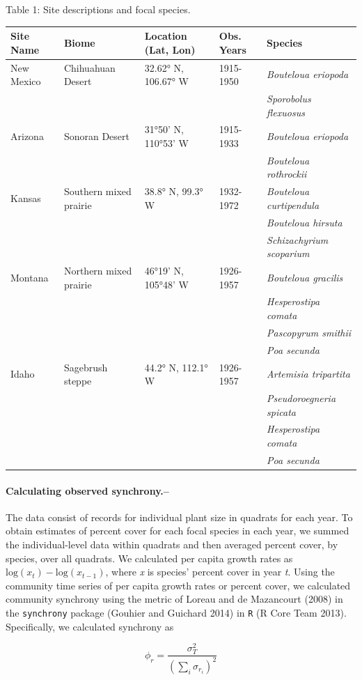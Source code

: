 \documentclass[12pt,]{article}
\begin{document}
\vspace{2em}

Table 1: Site descriptions and focal species. \footnotesize
\begin{longtable}[c]{@{}lllll@{}}
\toprule
Site Name & Biome & Location (Lat, Lon) & Obs. Years &
Species\tabularnewline
\midrule
\endhead
New Mexico & Chihuahuan Desert & 32.62° N, 106.67° W & 1915-1950 &
\emph{Bouteloua eriopoda}\tabularnewline
& & & & \emph{Sporobolus flexuosus}\tabularnewline
Arizona & Sonoran Desert & 31°50' N, 110°53' W & 1915-1933 &
\emph{Bouteloua eriopoda}\tabularnewline
& & & & \emph{Bouteloua rothrockii}\tabularnewline
Kansas & Southern mixed prairie & 38.8° N, 99.3° W & 1932-1972 &
\emph{Bouteloua curtipendula}\tabularnewline
& & & & \emph{Bouteloua hirsuta}\tabularnewline
& & & & \emph{Schizachyrium scoparium}\tabularnewline
Montana & Northern mixed prairie & 46°19' N, 105°48' W & 1926-1957 &
\emph{Bouteloua gracilis}\tabularnewline
& & & & \emph{Hesperostipa comata}\tabularnewline
& & & & \emph{Pascopyrum smithii}\tabularnewline
& & & & \emph{Poa secunda}\tabularnewline
Idaho & Sagebrush steppe & 44.2° N, 112.1° W & 1926-1957 &
\emph{Artemisia tripartita}\tabularnewline
& & & & \emph{Pseudoroegneria spicata}\tabularnewline
& & & & \emph{Hesperostipa comata}\tabularnewline
& & & & \emph{Poa secunda}\tabularnewline
\bottomrule
\end{longtable}

\normalsize

\paragraph{Calculating observed
synchrony.--}\label{calculating-observed-synchrony.}

The data consist of records for individual plant size in quadrats for
each year. To obtain estimates of percent cover for each focal species
in each year, we summed the individual-level data within quadrats and
then averaged percent cover, by species, over all quadrats. We
calculated per capita growth rates as
\(\text{log}(x_t) - \text{log}(x_{t-1})\), where \emph{x} is species'
percent cover in year \emph{t}. Using the community time series of per
capita growth rates or percent cover, we calculated community synchrony
using the metric of Loreau and {{de Mazancourt}} (2008) in the
\texttt{synchrony} package (Gouhier and Guichard 2014) in \texttt{R} (R Core Team 2013).
Specifically, we calculated synchrony as

\begin{equation}
\phi_r = \frac{\sigma^{2}_{T}}{(\sum_{i}\sigma_{r_{i}})^{2}}
\end{equation}
\end{document}
